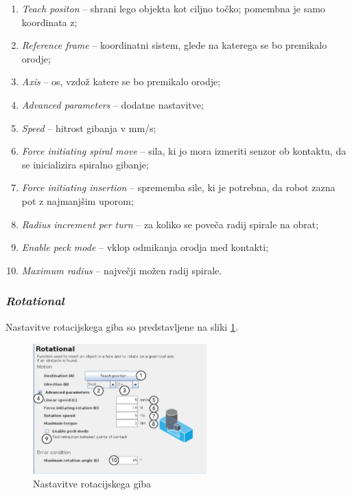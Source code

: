\begin{enumerate}
  \item \emph{Teach positon} -- shrani lego objekta kot ciljno točko; pomembna je samo koordinata z;
  \item \emph{Reference frame} -- koordinatni sistem, glede na katerega se bo premikalo orodje;
  \item \emph{Axis} -- os, vzdož katere se bo premikalo orodje;
  \item \emph{Advanced parameters} -- dodatne nastavitve;
  \item \emph{Speed} -- hitrost gibanja v mm/s;
  \item \emph{Force initiating spiral move} -- sila, ki jo mora izmeriti senzor ob kontaktu, da se inicializira spiralno gibanje;
  \item \emph{Force initiating insertion} -- sprememba sile, ki je potrebna, da robot zazna pot z najmanjšim uporom;
  \item \emph{Radius increment per turn} -- za koliko se poveča radij spirale na obrat;
  \item \emph{Enable peck mode} -- vklop odmikanja orodja med kontakti;
  \item \emph{Maximum radius} -- največji možen radij spirale.
\end{enumerate}

\subsubsection{\emph{Rotational}}

Nastavitve rotacijskega giba so predstavljene na sliki \ref{fig:ur_rotat}.
\begin{figure}[!hbt]
\centering
\includegraphics[width=0.6\textwidth]{ur5e_rotational.eps}
\caption{Nastavitve rotacijskega giba}
\label{fig:ur_rotat}
\end{figure}

